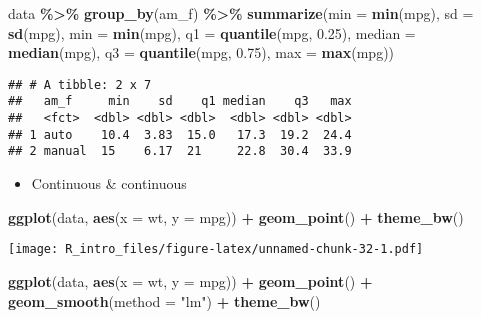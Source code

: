 \documentclass[
  a4paper,
]{article}
\newenvironment{Shaded}{\begin{snugshade}}{\end{snugshade}}
\newcommand{\AttributeTok}[1]{\textcolor[rgb]{0.13,0.29,0.53}{#1}}
\newcommand{\FloatTok}[1]{\textcolor[rgb]{0.00,0.00,0.81}{#1}}
\newcommand{\FunctionTok}[1]{\textcolor[rgb]{0.13,0.29,0.53}{\textbf{#1}}}
\newcommand{\NormalTok}[1]{#1}
\newcommand{\SpecialCharTok}[1]{\textcolor[rgb]{0.81,0.36,0.00}{\textbf{#1}}}
\newcommand{\StringTok}[1]{\textcolor[rgb]{0.31,0.60,0.02}{#1}}
\providecommand{\tightlist}{%
  \setlength{\itemsep}{0pt}\setlength{\parskip}{0pt}}
\begin{document}
\begin{Shaded}
\begin{Highlighting}[]
\NormalTok{data }\SpecialCharTok{\%\textgreater{}\%}
    \FunctionTok{group\_by}\NormalTok{(am\_f) }\SpecialCharTok{\%\textgreater{}\%}
    \FunctionTok{summarize}\NormalTok{(}\AttributeTok{min =} \FunctionTok{min}\NormalTok{(mpg), }\AttributeTok{sd =} \FunctionTok{sd}\NormalTok{(mpg), }\AttributeTok{min =} \FunctionTok{min}\NormalTok{(mpg), }\AttributeTok{q1 =} \FunctionTok{quantile}\NormalTok{(mpg,}
        \FloatTok{0.25}\NormalTok{), }\AttributeTok{median =} \FunctionTok{median}\NormalTok{(mpg), }\AttributeTok{q3 =} \FunctionTok{quantile}\NormalTok{(mpg, }\FloatTok{0.75}\NormalTok{),}
        \AttributeTok{max =} \FunctionTok{max}\NormalTok{(mpg))}
\end{Highlighting}
\end{Shaded}

\begin{verbatim}
## # A tibble: 2 x 7
##   am_f     min    sd    q1 median    q3   max
##   <fct>  <dbl> <dbl> <dbl>  <dbl> <dbl> <dbl>
## 1 auto    10.4  3.83  15.0   17.3  19.2  24.4
## 2 manual  15    6.17  21     22.8  30.4  33.9
\end{verbatim}

\begin{itemize}
\tightlist
\item
  Continuous \& continuous
\end{itemize}

\begin{Shaded}
\begin{Highlighting}[]
\FunctionTok{ggplot}\NormalTok{(data, }\FunctionTok{aes}\NormalTok{(}\AttributeTok{x =}\NormalTok{ wt, }\AttributeTok{y =}\NormalTok{ mpg)) }\SpecialCharTok{+} \FunctionTok{geom\_point}\NormalTok{() }\SpecialCharTok{+} \FunctionTok{theme\_bw}\NormalTok{()}
\end{Highlighting}
\end{Shaded}

\texttt{[image: R\_intro\_files/figure-latex/unnamed-chunk-32-1.pdf]}

\begin{Shaded}
\begin{Highlighting}[]
\FunctionTok{ggplot}\NormalTok{(data, }\FunctionTok{aes}\NormalTok{(}\AttributeTok{x =}\NormalTok{ wt, }\AttributeTok{y =}\NormalTok{ mpg)) }\SpecialCharTok{+} \FunctionTok{geom\_point}\NormalTok{() }\SpecialCharTok{+} \FunctionTok{geom\_smooth}\NormalTok{(}\AttributeTok{method =} \StringTok{"lm"}\NormalTok{) }\SpecialCharTok{+}
    \FunctionTok{theme\_bw}\NormalTok{()}
\end{Highlighting}
\end{Shaded}
\end{document}
